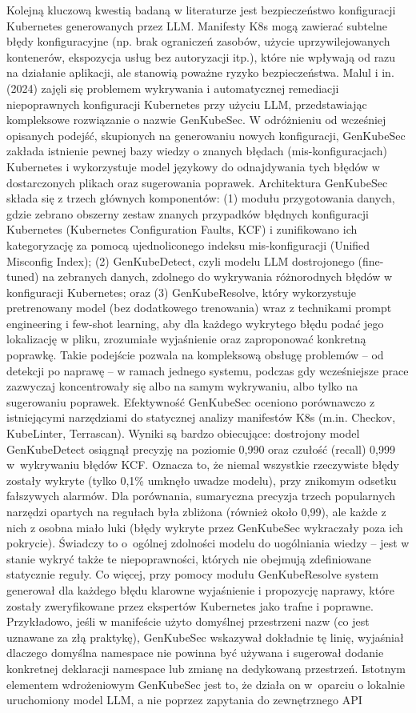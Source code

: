 Kolejną kluczową kwestią badaną w literaturze jest bezpieczeństwo konfiguracji Kubernetes generowanych przez LLM. Manifesty K8s mogą zawierać subtelne błędy konfiguracyjne (np. brak ograniczeń zasobów, użycie uprzywilejowanych kontenerów, ekspozycja usług bez autoryzacji itp.), które nie wpływają od razu na działanie aplikacji, ale stanowią poważne ryzyko bezpieczeństwa. Malul i in. (2024) zajęli się problemem wykrywania i automatycznej remediacji niepoprawnych konfiguracji Kubernetes przy użyciu LLM, przedstawiając kompleksowe rozwiązanie o nazwie GenKubeSec. W odróżnieniu od wcześniej opisanych podejść, skupionych na generowaniu nowych konfiguracji, GenKubeSec zakłada istnienie pewnej bazy wiedzy o znanych błędach (mis-konfiguracjach) Kubernetes i wykorzystuje model językowy do odnajdywania tych błędów w dostarczonych plikach oraz sugerowania poprawek. Architektura GenKubeSec składa się z trzech głównych komponentów: (1) modułu przygotowania danych, gdzie zebrano obszerny zestaw znanych przypadków błędnych konfiguracji Kubernetes (Kubernetes Configuration Faults, KCF) i zunifikowano ich kategoryzację za pomocą ujednoliconego indeksu mis-konfiguracji (Unified Misconfig Index); (2) GenKubeDetect, czyli modelu LLM dostrojonego (fine-tuned) na zebranych danych, zdolnego do wykrywania różnorodnych błędów w konfiguracji Kubernetes; oraz (3) GenKubeResolve, który wykorzystuje pretrenowany model (bez dodatkowego trenowania) wraz z technikami prompt engineering i few-shot learning, aby dla każdego wykrytego błędu podać jego lokalizację w pliku, zrozumiałe wyjaśnienie oraz zaproponować konkretną poprawkę. Takie podejście pozwala na kompleksową obsługę problemów – od detekcji po naprawę – w ramach jednego systemu, podczas gdy wcześniejsze prace zazwyczaj koncentrowały się albo na samym wykrywaniu, albo tylko na sugerowaniu poprawek. Efektywność GenKubeSec oceniono porównawczo z istniejącymi narzędziami do statycznej analizy manifestów K8s (m.in. Checkov, KubeLinter, Terrascan). Wyniki są bardzo obiecujące: dostrojony model GenKubeDetect osiągnął precyzję na poziomie 0,990 oraz czułość (recall) 0,999 w wykrywaniu błędów KCF. Oznacza to, że niemal wszystkie rzeczywiste błędy zostały wykryte (tylko 0,1\% umknęło uwadze modelu), przy znikomym odsetku fałszywych alarmów. Dla porównania, sumaryczna precyzja trzech popularnych narzędzi opartych na regułach była zbliżona (również około 0,99), ale każde z nich z osobna miało luki (błędy wykryte przez GenKubeSec wykraczały poza ich pokrycie). Świadczy to o ogólnej zdolności modelu do uogólniania wiedzy – jest w stanie wykryć także te niepoprawności, których nie obejmują zdefiniowane statycznie reguły. Co więcej, przy pomocy modułu GenKubeResolve system generował dla każdego błędu klarowne wyjaśnienie i propozycję naprawy, które zostały zweryfikowane przez ekspertów Kubernetes jako trafne i poprawne. Przykładowo, jeśli w manifeście użyto domyślnej przestrzeni nazw (co jest uznawane za złą praktykę), GenKubeSec wskazywał dokładnie tę linię, wyjaśniał dlaczego domyślna namespace nie powinna być używana i sugerował dodanie konkretnej deklaracji namespace lub zmianę na dedykowaną przestrzeń. Istotnym elementem wdrożeniowym GenKubeSec jest to, że działa on w oparciu o lokalnie uruchomiony model LLM, a nie poprzez zapytania do zewnętrznego API 